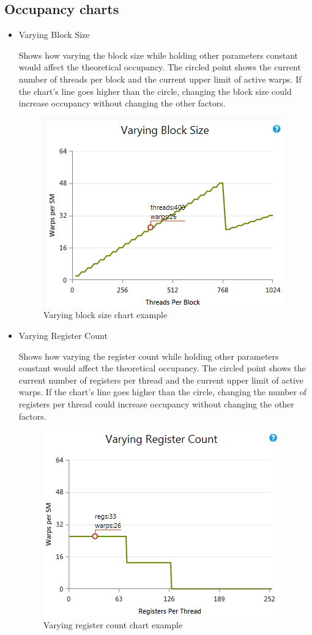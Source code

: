 \documentclass[oneside,openright,12pt,final,en]{mgr}
\begin{document}
\subsection{Occupancy charts}
\begin{itemize}
	\item Varying Block Size
	
	Shows how varying the block size while holding other parameters constant would affect the theoretical occupancy. The circled point shows the current number of threads per block and the current upper limit of active warps. If the chart's line goes higher than the circle, changing the block size could increase occupancy without changing the other factors.
	\begin{figure}[h!]
		\centering
		\includegraphics{AchievedOccupancyVaryingBlockSize}
		\caption{Varying block size chart example}
	\end{figure}
	
	\item Varying Register Count
	
	Shows how varying the register count while holding other parameters constant would affect the theoretical occupancy. The circled point shows the current number of registers per thread and the current upper limit of active warps. If the chart's line goes higher than the circle, changing the number of registers per thread could increase occupancy without changing the other factors.
		
	\begin{figure}[h!]
		\centering
		\includegraphics{AchievedOccupancyVaryingRegisterCount}
		\caption{Varying register count chart example}
	\end{figure}



\end{itemize}
\end{document}
